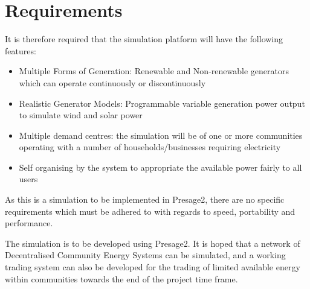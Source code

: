 \chapter{Requirements}
\label{Requirements}

It is therefore required that the simulation platform will have the following features:
\begin{itemize}
  \item Multiple Forms of Generation: Renewable and Non-renewable generators which can operate continuously or discontinuously
  \item Realistic Generator Models: Programmable variable generation power output to simulate wind and solar power
  \item Multiple demand centres: the simulation will be of one or more communities operating with a number of households/businesses requiring electricity
  \item Self organising by the system to appropriate the available power fairly to all users
\end{itemize}

As this is a simulation to be implemented in Presage2, there are no specific requirements which must be adhered to with regards to speed, portability and performance.  

The simulation is to be developed using Presage2. It is hoped that a network of Decentralised Community Energy Systems can be simulated, and a working trading system can also be developed for the trading of limited available energy within communities towards the end of the project time frame. 